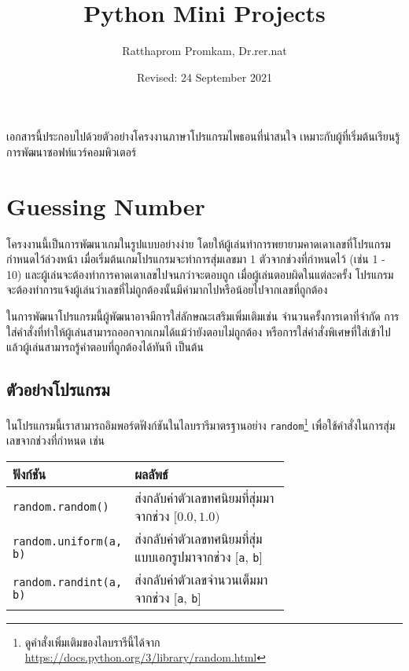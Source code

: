 \documentclass[a4paper]{article}
\title{Python Mini Projects}
\author{Ratthaprom Promkam, Dr.rer.nat}
\date{Revised: 24 September 2021}
\begin{document}
\maketitle
เอกสารนี้ประกอบไปด้วยตัวอย่างโครงงานภาษาโปรแกรมไพธอนที่น่าสนใจ เหมาะกับผู้ที่เริ่มต้นเรียนรู้การพัฒนาซอฟท์แวร์คอมพิวเตอร์

\tableofcontents

\cleardoublepage
\section{Guessing Number}
โครงงานนี้เป็นการพัฒนาเกมในรูปแบบอย่างง่าย โดยให้ผู้เล่นทำการพยายามคาดเดาเลขที่โปรแกรมกำหนดไว้ล่วงหน้า เมื่อเริ่มต้นเกมโปรแกรมจะทำการสุ่มเลขมา 1 ตัวจากช่วงที่กำหนดไว้ (เช่น 1 - 10)  และผู้เล่นจะต้องทำการคาดเดาเลขไปจนกว่าจะตอบถูก เมื่อผู้เล่นตอบผิดในแต่ละครั้ง โปรแกรมจะต้องทำการแจ้งผู้เล่นว่าเลขที่ไม่ถูกต้องนั้นมีค่ามากไปหรือน้อยไปจากเลขที่ถูกต้อง

ในการพัฒนาโปรแกรมนี้ผู้พัฒนาอาจมีการใส่ลักษณะเสริมเพิ่มเติมเช่น จำนวนครั้งการเดาที่จำกัด การใส่คำสั่งที่ทำให้ผู้เล่นสามารถออกจากเกมได้แม้ว่ายังตอบไม่ถูกต้อง หรือการใส่คำสั่งพิเศษที่ใส่เข้าไปแล้วผู้เล่นสามารถรู้คำตอบที่ถูกต้องได้ทันที เป็นต้น

\subsection*{ตัวอย่างโปรแกรม}

ในโปรแกรมนี้เราสามารถอิมพอร์ตฟังก์ชันในไลบรารีมาตรฐานอย่าง \texttt{random}\footnote{ดูคำสั่งเพิ่มเติมของไลบรารีนี้ได้จาก \url{https://docs.python.org/3/library/random.html}} เพื่อใช้คำสั่งในการสุ่มเลขจากช่วงที่กำหนด เช่น

\begin{center}
\begin{tabular}{|l|p{0.7\linewidth}|}
\hline
ฟังก์ชัน & ผลลัพธ์  \\  
\hline

\texttt{random.random()} &
ส่งกลับค่าตัวเลขทศนิยมที่สุ่มมาจากช่วง $[0.0, 1.0)$ \\
\hline

\texttt{random.uniform(a, b)} &
ส่งกลับค่าตัวเลขทศนิยมที่สุ่มแบบเอกรูปมาจากช่วง [\texttt{a}, \texttt{b}] \\
\hline

\texttt{random.randint(a, b)} &
ส่งกลับค่าตัวเลขจำนวนเต็มมาจากช่วง [\texttt{a}, \texttt{b}] \\
\hline

\end{tabular}
\end{center}
\end{document}
